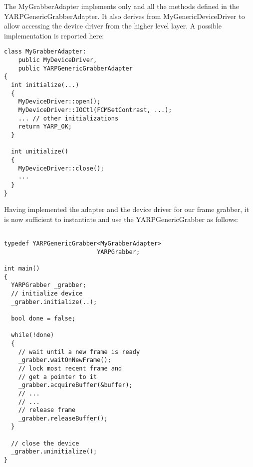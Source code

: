  The MyGrabberAdapter implements only and all the methods defined in the YARPGenericGrabberAdapter. It also derives from MyGenericDeviceDriver to allow accessing the device driver from the higher level layer. A possible implementation is reported here:

{\small \begin{verbatim}
class MyGrabberAdapter: 
	public MyDeviceDriver,
	public YARPGenericGrabberAdapter
{
  int initialize(...)
  {
    MyDeviceDriver::open();
    MyDeviceDriver::IOCtl(FCMSetContrast, ...);
    ... // other initializations
    return YARP_OK;
  }

  int unitialize()
  {
    MyDeviceDriver::close();
    ...
  }
}
\end{verbatim}}

Having implemented the adapter and the device driver for our frame grabber, it is now sufficient to instantiate and use the YARPGenericGrabber as follows:

{\small
\begin{verbatim}

typedef YARPGenericGrabber<MyGrabberAdapter> 
                          YARPGrabber;

int main()
{
  YARPGrabber _grabber;
  // initialize device
  _grabber.initialize(..);
  
  bool done = false;

  while(!done)
  {
    // wait until a new frame is ready
    _grabber.waitOnNewFrame();
    // lock most recent frame and
    // get a pointer to it
    _grabber.acquireBuffer(&buffer);
    // ...
    // ...
    // release frame
    _grabber.releaseBuffer();
  }

  // close the device
  _grabber.uninitialize();
}
\end{verbatim}
}